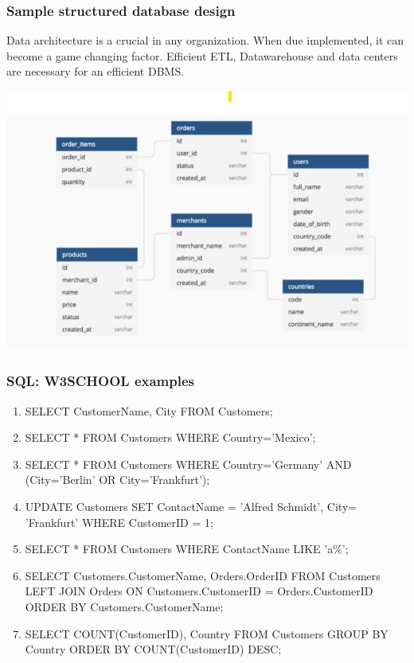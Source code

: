 \documentclass{beamer}
\begin{document}
\begin{frame}
    \centering
    \frametitle{Sample structured database design}
    \begin{flushleft}
        Data architecture is a crucial in any organization. When due implemented, it can become a game changing factor. Efficient ETL, Datawarehouse and 
        data centers are necessary for an efficient DBMS.        
    \end{flushleft}
    \includegraphics[scale=0.5]{figures/db_design.jpg}
\end{frame}

\begin{frame}
    \frametitle{SQL: W3SCHOOL examples}
    \begin{enumerate}
\tiny        \item SELECT CustomerName, City FROM Customers; 
        \item SELECT * FROM Customers
        WHERE Country='Mexico';
        \item SELECT * FROM Customers
        WHERE Country='Germany' AND (City='Berlin' OR City='Frankfurt');
        \item UPDATE Customers
        SET ContactName = 'Alfred Schmidt', City= 'Frankfurt'
        WHERE CustomerID = 1;
        \item SELECT * FROM Customers
        WHERE ContactName LIKE 'a\%';
        \item SELECT Customers.CustomerName, Orders.OrderID
        FROM Customers
        LEFT JOIN Orders ON Customers.CustomerID = Orders.CustomerID
        ORDER BY Customers.CustomerName;
        \item SELECT COUNT(CustomerID), Country
        FROM Customers
        GROUP BY Country
        ORDER BY COUNT(CustomerID) DESC;
    \end{enumerate}
\end{frame}
\end{document}
